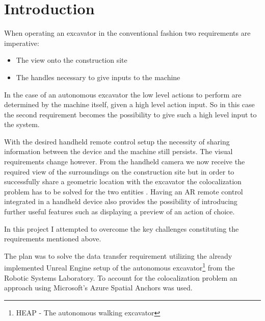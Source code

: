 \chapter{Introduction}
\label{ch:introduction}


When operating an excavator in the conventional fashion two requirements are imperative: \begin{itemize}
    \item The view onto the construction site
    \item The handles necessary to give inputs to the machine
\end{itemize}
In the case of an autonomous excavator the low level actions to perform are determined by the machine itself, given a high level action input. So in this case the second requirement becomes the possibility to give such a high level input to the system.

With the desired handheld remote control setup the necessity of sharing information between the device and the machine still persists. The visual requirements change however. From the handheld camera we now receive the required view of the surroundings on the construction site but in order to successfully share a geometric location with the excavator the colocalization problem has to be solved for the two entities   . Having an AR remote control integrated in a handheld device also provides the possibility of introducing further useful features such as displaying a preview of an action of choice. 

In this project I attempted to overcome the key challenges constituting the requirements mentioned above. 

The plan was to solve the data transfer requirement utilizing the already implemented Unreal Engine setup of the autonomous excavator\footnote{HEAP - The autonomous walking excavator\citep*{heap}} from the Robotic Systems Laboratory. To account for the colocalization problem an approach using Microsoft's Azure Spatial Anchors was used.